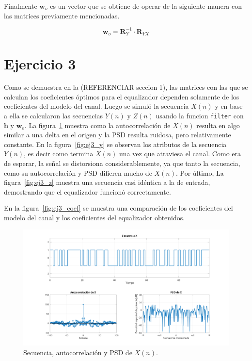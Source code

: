 Finalmente $\textbf{w}_o$ es un vector que se obtiene de operar de la siguiente manera con las matrices previamente mencionadas.

\begin{equation}
	\textbf{w}_o = \textbf{R}_Y^{-1} \cdot \textbf{R}_{YX}
\end{equation}

\section{Ejercicio 3}

Como se demuestra en la (REFERENCIAR seccion 1), las matrices con las que se calculan los coeficientes óptimos para el equalizador dependen solamente de los coeficientes del modelo del canal. Luego se simuló la secuencia $X(n)$ y en base a ella se calcularon las secuencias $Y(n)$ y $Z(n)$ usando la funcion \verb*|filter| con $\textbf{h}$ y $\textbf{w}_o$. La figura~\ref{fig:ej3_x} muestra como la autocorrelación de $X(n)$ resulta en algo similar a una delta en el origen y la PSD resulta ruidosa, pero relativamente constante. En la figura~\ref{fig:ej3_y} se observan los atributos de la secuencia $Y(n)$, es decir como termina $X(n)$ una vez que atraviesa el canal. Como era de esperar, la señal se distorsiona considerablemente, ya que tanto la secuencia, como su autocorrelación y PSD difieren mucho de $X(n)$. Por último, La figura~\ref{fig:ej3_z} muestra una secuencia casi idéntica a la de entrada, demostrando que el equalizador funcionó correctamente.

En la figura~\ref{fig:ej3_coef} se muestra una comparación de los coeficientes del modelo del canal y los coeficientes del equalizador obtenidos. 

\begin{figure}[h]
	\centering
	\includegraphics[width=1\linewidth]{img/ej3_x.pdf}
	\caption{Secuencia, autocorrelación y PSD de $X(n)$.}
	\label{fig:ej3_x}
\end{figure}

